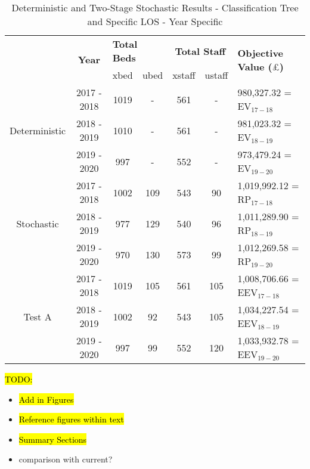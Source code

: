 \documentclass[../thesis.tex]{subfiles}
\begin{document}
\begin{table}[h!]
    \centering
    \begin{tabular}{ccccccl}\toprule
 & \multirow{2}{*}{\textbf{Year}}& \multicolumn{2}{l}{\textbf{Total Beds}} & \multicolumn{2}{c}{\textbf{Total Staff}} & \multirow{2}{*}{\textbf{Objective Value ($\pounds$)}}\\ \cmidrule(lr){3-4} \cmidrule(lr){5-6}
&& xbed           & ubed          & xstaff         & ustaff         \\ \midrule
     \multirow{3}{*}{Deterministic} & 2017 - 2018 & 1019 & - & 561 & - & 980,327.32 = EV$_{17-18}$ \\ 
      & 2018 - 2019 &1010 & - &561 & - & 981,023.32 = EV$_{18-19}$ \\
      & 2019 - 2020 & 997 & - & 552 & - &  973,479.24 = EV$_{19-20}$\\\midrule
     \multirow{3}{*}{Stochastic} & 2017 - 2018 &1002 & 109 & 543 & 90 & 1,019,992.12 = RP$_{17-18}$ \\ 
      & 2018 - 2019 &977 & 129 &540 & 96& 1,011,289.90 = RP$_{18-19}$ \\
      & 2019 - 2020 & 970 & 130 & 573 &99 & 1,012,269.58 = RP$_{19-20}$\\ \midrule
      \multirow{3}{*}{Test A}& 2017 - 2018 &1019& 105&561&105&1,008,706.66 = EEV$_{17-18}$\\
      & 2018 - 2019 &1002& 92 & 543 & 105& 1,034,227.54 = EEV$_{18-19}$\\
      & 2019 - 2020 & 997 & 99 & 552 &120 &  1,033,932.78 = EEV$_{19-20}$\\\bottomrule      
    \end{tabular}
    \caption{Deterministic and Two-Stage Stochastic Results - Classification Tree and Specific LOS - Year Specific}
    \label{tab:Results5}
\end{table}



\hl{TODO:}
\begin{itemize}
    \item \hl{Add in Figures}
    \item \hl{Reference figures within text}
    \item \hl{Summary Sections}
    \item comparison with current?
\end{itemize}
\end{document}
